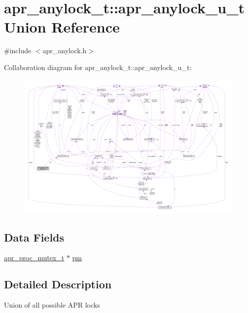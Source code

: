 \hypertarget{unionapr__anylock__t_1_1apr__anylock__u__t}{}\section{apr\+\_\+anylock\+\_\+t\+:\+:apr\+\_\+anylock\+\_\+u\+\_\+t Union Reference}
\label{unionapr__anylock__t_1_1apr__anylock__u__t}


{\ttfamily \#include $<$apr\+\_\+anylock.\+h$>$}



Collaboration diagram for apr\+\_\+anylock\+\_\+t\+:\+:apr\+\_\+anylock\+\_\+u\+\_\+t\+:
\nopagebreak
\begin{figure}[H]
\begin{center}
\leavevmode
\includegraphics[width=350pt]{unionapr__anylock__t_1_1apr__anylock__u__t__coll__graph}
\end{center}
\end{figure}
\subsection*{Data Fields}
\begin{DoxyCompactItemize}
\item 
\hyperlink{structapr__proc__mutex__t}{apr\+\_\+proc\+\_\+mutex\+\_\+t} $\ast$ \hyperlink{unionapr__anylock__t_1_1apr__anylock__u__t_aeb1a5d1e7a4e326482983ea956caae42}{pm}
\end{DoxyCompactItemize}


\subsection{Detailed Description}
Union of all possible A\+PR locks 

